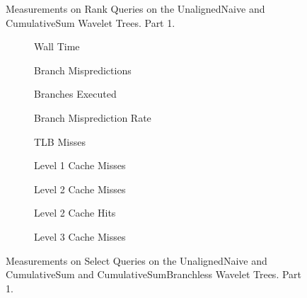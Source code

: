 \begin{figure}
\caption{Measurements on Rank Queries on the UnalignedNaive and CumulativeSum Wavelet Trees. Part 1.}
\label{fig:CumulativeSumRank}
\end{figure}





\clearpage




\begin{figure}\tiny

\begin{subfigure}{0.30\textwidth}
	
	\caption{Wall Time}
	\label{fig:CumulativeSumSelectWalltime}
\end{subfigure}
\hfill
\begin{subfigure}{0.30\textwidth}
	
	\caption{Branch Mispredictions}
	\label{fig:CumulativeSumSelectBranchMiss}
\end{subfigure}
\hfill
\begin{subfigure}{0.30\textwidth}
	
	\caption{Branches Executed}
	\label{fig:CumulativeSumSelectBranchExe}
\end{subfigure}


\begin{subfigure}{0.30\textwidth}
	
	\caption{Branch Misprediction Rate}
	\label{fig:CumulativeSumSelectBranchMissRate}
\end{subfigure}
\hfill
\begin{subfigure}{0.30\textwidth}
	
	\caption{TLB Misses}
	\label{fig:CumulativeSumSelectTLBMiss}
\end{subfigure}
\hfill
\begin{subfigure}{0.30\textwidth}
	
	\caption{Level 1 Cache Misses}
	\label{fig:CumulativeSumSelectL1CM}
\end{subfigure}


\begin{subfigure}{0.30\textwidth}
	
	\caption{Level 2 Cache Misses}
	\label{fig:CumulativeSumSelectL2CM}
\end{subfigure}
\hfill
\begin{subfigure}{0.30\textwidth}
	
	\caption{Level 2 Cache Hits}
	\label{fig:CumulativeSumSelectL2CHits}
\end{subfigure}
\hfill
%	
\begin{subfigure}{0.30\textwidth}
	
	\caption{Level 3 Cache Misses}
	\label{fig:CumulativeSumSelectL3CM}
\end{subfigure}

\caption{Measurements on Select Queries on the UnalignedNaive and CumulativeSum and CumulativeSumBranchless Wavelet Trees. Part 1.}
\label{fig:CumulativeSumSelect}
\end{figure}
